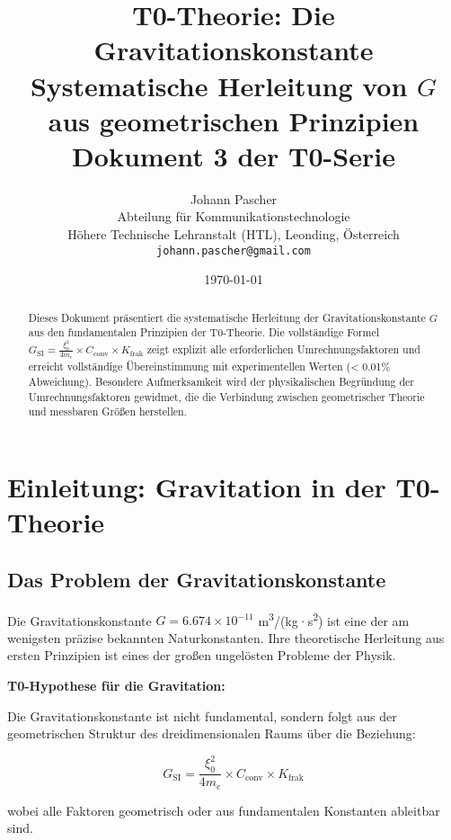 \documentclass[12pt,a4paper]{article}
\title{\textbf{T0-Theorie: Die Gravitationskonstante}\\[0.5cm]
	\large Systematische Herleitung von $G$ aus geometrischen Prinzipien\\[0.3cm]
	\normalsize Dokument 3 der T0-Serie}
\author{Johann Pascher\\
	Abteilung für Kommunikationstechnologie\\
	Höhere Technische Lehranstalt (HTL), Leonding, Österreich\\
	\texttt{johann.pascher@gmail.com}}
\date{\today}
\begin{document}
	
	\maketitle
	
	\begin{abstract}
		Dieses Dokument präsentiert die systematische Herleitung der Gravitationskonstante $G$ aus den fundamentalen Prinzipien der T0-Theorie. Die vollständige Formel $G_{\text{SI}} = \frac{\xi_0^2}{4 m_e} \times C_{\text{conv}} \times K_{\text{frak}}$ zeigt explizit alle erforderlichen Umrechnungsfaktoren und erreicht vollständige Übereinstimmung mit experimentellen Werten (< 0.01\% Abweichung). Besondere Aufmerksamkeit wird der physikalischen Begründung der Umrechnungsfaktoren gewidmet, die die Verbindung zwischen geometrischer Theorie und messbaren Größen herstellen.
	\end{abstract}
	
	\tableofcontents
	\newpage
	
	\section{Einleitung: Gravitation in der T0-Theorie}
	
	\subsection{Das Problem der Gravitationskonstante}
	
	Die Gravitationskonstante $G = 6.674 \times 10^{-11}$ m\textsuperscript{3}/(kg·s\textsuperscript{2}) ist eine der am wenigsten präzise bekannten Naturkonstanten. Ihre theoretische Herleitung aus ersten Prinzipien ist eines der großen ungelösten Probleme der Physik.
	
	\begin{keyresult}
		\textbf{T0-Hypothese für die Gravitation:}
		
		Die Gravitationskonstante ist nicht fundamental, sondern folgt aus der geometrischen Struktur des dreidimensionalen Raums über die Beziehung:
		
		\begin{equation}
			\boxed{G_{\text{SI}} = \frac{\xi_0^2}{4 m_e} \times C_{\text{conv}} \times K_{\text{frak}}}
			\label{eq:G_complete}
		\end{equation}
		
		wobei alle Faktoren geometrisch oder aus fundamentalen Konstanten ableitbar sind.
	\end{keyresult}
	
\end{document}

